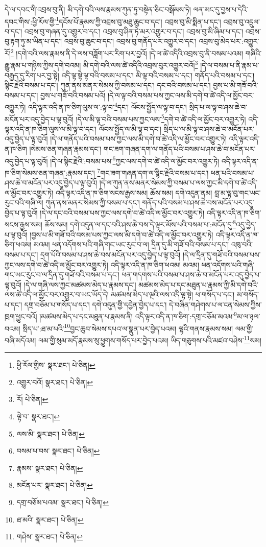 དེ་ལ་དབང་གི་འབྲས་བུ་ནི། མི་དགེ་བའི་ལས་རྣམས་ཀུན་ཏུ་བསྟེན་ཅིང་བསྒོམས་ཏེ། ལན་མང་དུ་བྱས་པ་དེའི་དབང་གིས་:ཕྱི་རོལ་གྱི་\footnote{ཕྱི་རོལ་གྱིས་  སྣར་ཐང་།  པེ་ཅིན། }དངོས་པོ་རྣམས་ཀྱི་འབྲས་བུ་མཐུ་ཆུང་བ་དང་། འབྲས་བུ་མི་སྨིན་པ་དང་། འབྲས་བུ་འདྲུལ་བ་དང་། འབྲས་བུ་གཞན་དུ་འགྱུར་བ་དང་། འབྲས་བུ་ཤིན་ཏེ་མར་འགྱུར་བ་དང་། འབྲས་བུ་མི་ཞིམ་པ་དང་། འབྲས་བུ་རྟག་ཏུ་མ་ཡིན་པ་དང་། འབྲས་བུ་ཆུང་བ་དང་། འབྲས་བུ་གནོད་པར་འགྱུར་བ་དང་། འབྲས་བུ་མེད་པར་:འགྱུར་རོ།\footnote{འགྱུར་བའོ།  སྣར་ཐང་།  པེ་ཅིན། } །དགེ་བའི་ལས་རྣམས་ནི་དེ་ལས་བཟློག་པར་རིག་པར་བྱའོ། །དེ་ལ་ཚེ་འདིའི་འབྲས་བུ་ནི་བསམ་པའམ། གཞིའི་རྒྱུ་རྣམ་པ་གཉིས་ཀྱིས་དགེ་བའམ། མི་དགེ་བའི་ལས་ཚེ་འདིའི་འབྲས་བུར་འགྱུར་བའོ།\footnote{རོ།  པེ་ཅིན། } །དེ་ལ་བསམ་པ་ནི་རྣམ་པ་བརྒྱད་དུ་རིག་པར་བྱ་སྟེ། འདི་ལྟ་སྟེ་ལྟ་བའི་བསམ་པ་དང་། མི་ལྟ་བའི་བསམ་པ་དང་། གནོད་པའི་བསམ་པ་དང་། སྙིང་རྗེའི་བསམ་པ་དང་། ཀུན་ནས་མནར་སེམས་ཀྱི་བསམ་པ་དང་། དང་བའི་བསམ་པ་དང་། བྱས་པ་མི་གཟོ་བའི་བསམ་པ་དང་། བྱས་པ་གཟོ་བའི་བསམ་པའོ། །དེ་ལ་ལྟ་བའི་བསམ་པས་ཀྱང་ལས་མི་དགེ་བ་ཚེ་འདི་ལ་མྱོང་བར་འགྱུར་ཏེ། འདི་ལྟར་འདི་ན་ཁ་ཅིག་ལུས་ལ་:ལྟ་བ་\footnote{ལྟེ་བ་  སྣར་ཐང་། }དང་། ལོངས་སྤྱོད་ལ་ལྟ་བ་དང་། སྲིད་པ་ལ་ལྟ་བ་ཤས་ཆེ་བ་མངོན་པར་འདུ་བྱེད་པ་ལྟ་བུའོ། །དེ་ལ་མི་ལྟ་བའི་བསམ་པས་ཀྱང་ལས་\footnote{ལས་མི་  སྣར་ཐང་།  པེ་ཅིན། }དགེ་བ་ཚེ་འདི་ལ་མྱོང་བར་འགྱུར་ཏེ། འདི་ལྟར་འདི་ན་ཁ་ཅིག་ལུས་ལ་མི་ལྟ་བ་དང་། ལོངས་སྤྱོད་ལ་མི་ལྟ་བ་དང་། སྲིད་པ་ལ་མི་ལྟ་བ་ཤས་ཆེ་བ་མངོན་པར་འདུ་བྱེད་པ་ལྟ་བུའོ། །དེ་ལ་གནོད་པའི་བསམ་པས་ཀྱང་ལས་མི་དགེ་བ་ཚེ་འདི་ལ་མྱོང་བར་འགྱུར་ཏེ། འདི་ལྟར་འདི་ན་ཁ་ཅིག །སེམས་ཅན་གཞན་རྣམས་དང་། གང་ཟག་གཞན་དག་ལ་གནོད་པའི་བསམ་པ་ཤས་ཆེ་བ་མངོན་པར་འདུ་བྱེད་པ་ལྟ་བུའོ། །དེ་ལ་སྙིང་རྗེའི་:བསམ་པས་\footnote{བསམ་པ་བས་  སྣར་ཐང་།  པེ་ཅིན། }ཀྱང་ལས་དགེ་བ་ཚེ་འདི་ལ་མྱོང་བར་འགྱུར་ཏེ། འདི་ལྟར་འདི་ན་ཁ་ཅིག་སེམས་ཅན་གཞན་:རྣམས་དང་། \footnote{རྣམས་  སྣར་ཐང་།  པེ་ཅིན། }གང་ཟག་གཞན་དག་ལ་སྙིང་རྗེའི་བསམ་པ་དང་། ཕན་པའི་བསམ་པ་ཤས་ཆེ་བ་མངོན་པར་འདུ་བྱེད་པ་ལྟ་བུའོ། །དེ་ལ་ཀུན་ནས་མནར་སེམས་ཀྱི་བསམ་པ་ལས་ཀྱང་མི་དགེ་བ་ཚེ་འདི་ལ་མྱོང་བར་འགྱུར་ཏེ། འདི་ལྟར་འདི་ན་ཁ་ཅིག་སངས་རྒྱས་སམ། ཆོས་སམ། དགེ་འདུན་ནམ། བླ་མ་ལྟ་བུ་གང་ཡང་རུང་བའི་གཞི་ལ། ཀུན་ནས་མནར་སེམས་ཀྱི་བསམ་པ་དང་། གནོད་པའི་བསམ་པ་ཤས་ཆེ་བས་མངོན་པར་འདུ་བྱེད་པ་ལྟ་བུའོ། །དེ་ལ་དང་བའི་བསམ་པས་ཀྱང་ལས་དགེ་བ་ཚེ་འདི་ལ་མྱོང་བར་འགྱུར་ཏེ། འདི་ལྟར་འདི་ན་ཁ་ཅིག་སངས་རྒྱས་སམ། ཆོས་སམ། དགེ་འདུན་ལ་དང་བའི་ཤས་ཆེ་བས་དེ་ལྟར་མོས་པའི་བསམ་པ་:མངོན་དུ་\footnote{མངོན་པར་  སྣར་ཐང་།  པེ་ཅིན། }འདུ་བྱེད་པ་ལྟ་བུའོ། །བྱས་པ་མི་གཟོ་བའི་བསམ་པས་ཀྱང་ལས་མི་དགེ་བ་ཚེ་འདི་ལ་མྱོང་བར་འགྱུར་ཏེ། འདི་ལྟར་འདི་ན་ཁ་ཅིག་ཕའམ། མའམ། ཕན་འདོགས་པའི་གཞི་གང་ཡང་རུང་བ་ལ། དྲིན་དུ་མི་གཟོ་བའི་བསམ་པ་དང་། འཁུ་བའི་བསམ་པ་དང་། དྲག་པོའི་བསམ་པ་ཤས་ཆེ་བས་མངོན་པར་འདུ་བྱེད་པ་ལྟ་བུའོ། །དེ་ལ་དྲིན་དུ་གཟོ་བའི་བསམ་པས་ཀྱང་ལས་དགེ་བ་ཚེ་འདི་ལ་མྱོང་བར་འགྱུར་ཏེ། འདི་ལྟར་འདི་ན་ཁ་ཅིག་ཕའམ། མའམ། ཕན་འདོགས་པའི་གཞི་གང་ཡང་རུང་བ་ལ་དྲིན་དུ་གཟོ་བའི་བསམ་པ་དང་། ཕན་གདགས་པའི་བསམ་པ་ཤས་ཆེ་བ་མངོན་པར་འདུ་བྱེད་པ་ལྟ་བུའོ། །དེ་ལ་གཞི་ལས་ཀྱང་མཚམས་མེད་པ་རྣམས་དང་། མཚམས་མེད་པ་དང་མཐུན་པ་རྣམས་ཀྱི་མི་དགེ་བའི་ལས་ཚེ་འདི་ལ་མྱོང་བར་འགྱུར་བ་ཡང་ཡོད་དེ། མཚམས་མེད་པ་ལྔའི་ལས་འདི་ལྟ་སྟེ། ཕ་གསོད་པ་དང་། མ་གསོད་པ་དང་། དགྲ་བཅོམ་པ་གསོད་པ་དང་། དགེ་འདུན་གྱི་དབྱེན་བྱེད་པ་དང་། དེ་བཞིན་གཤེགས་པ་ལ་ངན་སེམས་ཀྱིས་ཁྲག་ཕྱུང་བའོ། །མཚམས་མེད་པ་དང་མཐུན་པ་རྣམས་ནི། འདི་ལྟར་འདི་ན་ཁ་ཅིག་:དགྲ་བཅོམ་མའམ་\footnote{དགྲ་བཅོམ་པའམ་  སྣར་ཐང་།  པེ་ཅིན། }མ་ལ་ཉལ་བའམ། སྲིད་པ་:ཐ་མ་པའི་\footnote{ཐ་མའི་  སྣར་ཐང་།  པེ་ཅིན། }བྱང་ཆུབ་སེམས་དཔའ་ལ་སྣུན་པར་བྱེད་པའམ། ལྷའི་གནས་རྣམས་སམ། ལམ་གྱི་བཞི་མདོའམ། ལམ་གྱི་སུམ་མདོ་རྣམས་སུ་ཕྱུགས་གསོད་པར་བྱེད་པའམ། ཡིད་གཅུགས་པའི་མཛའ་བཤེས་\footnote{གཤེས་  སྣར་ཐང་།  པེ་ཅིན། }སམ། 
